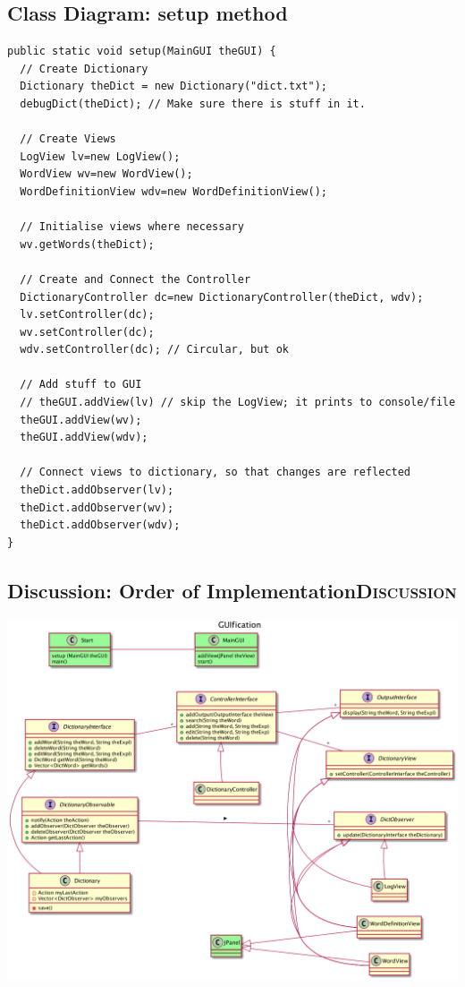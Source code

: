 \documentclass[10pt,t,a4paper]{article}
\begin{document}
\subsection{Class Diagram: setup method}
\label{sec:orgheadline13}
\begin{verbatim}
public static void setup(MainGUI theGUI) {
  // Create Dictionary
  Dictionary theDict = new Dictionary("dict.txt");
  debugDict(theDict); // Make sure there is stuff in it.

  // Create Views
  LogView lv=new LogView();
  WordView wv=new WordView();
  WordDefinitionView wdv=new WordDefinitionView();

  // Initialise views where necessary
  wv.getWords(theDict);

  // Create and Connect the Controller
  DictionaryController dc=new DictionaryController(theDict, wdv);
  lv.setController(dc);
  wv.setController(dc);
  wdv.setController(dc); // Circular, but ok

  // Add stuff to GUI
  // theGUI.addView(lv) // skip the LogView; it prints to console/file
  theGUI.addView(wv);
  theGUI.addView(wdv);

  // Connect views to dictionary, so that changes are reflected
  theDict.addObserver(lv);
  theDict.addObserver(wv);
  theDict.addObserver(wdv);
}
\end{verbatim}
\subsection{Discussion: Order of Implementation\hfill{}\textsc{Discussion}}
\label{sec:orgheadline14}
\includegraphics[width=.9\linewidth]{./FDictionaryClass4.png}
\end{document}
